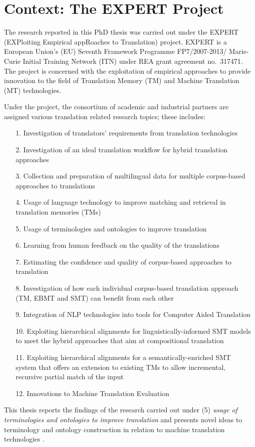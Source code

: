 
\section{Context: The EXPERT Project}

The research reported in this PhD thesis was carried out under the EXPERT (EXPloiting Empirical appRoaches to Translation) project. EXPERT is a European Union's (EU)  Seventh Framework Programme FP7/2007-2013/ Marie-Curie Initial Training Network (ITN) under REA grant agreement no.~317471. The project is concerned with the exploitation of empirical approaches to provide innovation to the field of Translation Memory (TM) and Machine Translation (MT) technologies.

Under the project, the consortium of academic and industrial partners are assigned various translation related research topics; these includes:

\vspace{5mm}
\begin{itemize}[nosep]
\item[1.] Investigation of translators' requirements from translation technologies
\item[2.] Investigation of an ideal translation workflow for hybrid translation approaches
\item[3.] Collection and preparation of multilingual data for multiple corpus-based approaches to translations
\item[4.] Usage of language technology to improve matching and retrieval in translation memories (TMs)
\item[5.] Usage of terminologies and ontologies to improve translation
\item[6.] Learning from human feedback on the quality of the translations
\item[7.] Estimating the confidence and quality of corpus-based approaches to translation
\item[8.] Investigation of how each individual corpus-based translation approach (TM, EBMT and SMT) can benefit from each other
\item[9.] Integration of NLP technologies into tools for Computer Aided Translation
\item[10.] Exploiting hierarchical alignments for linguistically-informed SMT models to meet the hybrid approaches that aim at compositional translation
\item[11.] Exploiting hierarchical alignments for a semantically-enriched SMT system that offers an extension to existing TMs to allow incremental, recursive partial match of the input
\item[12.] Innovations to Machine Translation Evaluation 
\end{itemize}

This thesis reports the findings of the research carried out under (5) \textit{usage of terminologies and ontologies to improve translation} and presents novel ideas to terminology and ontology construction in relation to machine translation technologies \citep{pervasive2015,tan-gupta-vangenabith:2015:SemEval}. 

